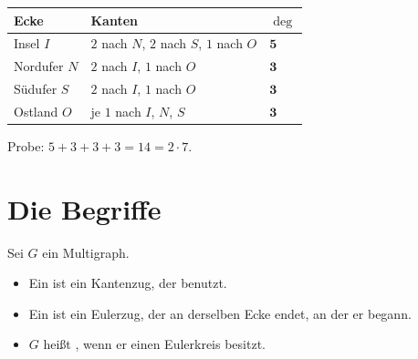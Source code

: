\begin{merksatz}
\begin{center}
\end{center}

\begin{center}
\renewcommand{\arraystretch}{1.45}
\begin{tabular}{@{}P{2.4cm}P{3.6cm}P{1.6cm}@{}}
\toprule
\textbf{Ecke} & \textbf{Kanten} & $\deg$\\
\midrule
Insel $I$ & $2$ nach $N$, $2$ nach $S$, $1$ nach $O$ & $\mathbf{5}$\\
Nordufer $N$ & $2$ nach $I$, $1$ nach $O$ & $\mathbf{3}$\\
Südufer $S$ & $2$ nach $I$, $1$ nach $O$ & $\mathbf{3}$\\
Ostland $O$ & je $1$ nach $I$, $N$, $S$ & $\mathbf{3}$\\
\bottomrule
\end{tabular}
\end{center}

Probe: $5+3+3+3 = 14 = 2 \cdot 7$. \checkmark
\end{merksatz}

\section{Die Begriffe}

\begin{definition}
Sei $G$ ein Multigraph.
\begin{itemize}[leftmargin=1.4em, itemsep=4pt]
\item Ein  ist ein Kantenzug, der  benutzt.
\item Ein  ist ein Eulerzug, der an derselben Ecke endet, an der er begann.
\item $G$ heißt , wenn er einen Eulerkreis besitzt.
\end{itemize}
\end{definition}

